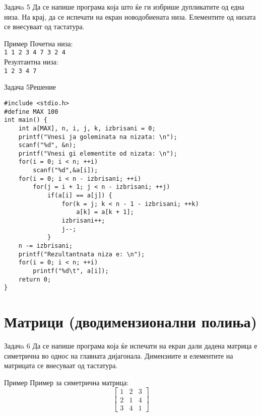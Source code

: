 \begin{frame}{Задачa 5}
Да се напише програма која што ќе ги избрише дупликатите од една низа. На крај,
да се испечати на екран новодобиената низа. Елементите од низата се внесуваат од тастатура.
\begin{exampleblock}{Пример}
Почетна низа:\\
\texttt{1 {\color{red}1} 2 3 4 7 {\color{red}3} {\color{red}2} {\color{red}4}}\\
Резултантна низа:\\
\texttt{1 2 3 4 7}\\
\end{exampleblock}
\end{frame}

\begin{frame}[fragile]{Задача 5}{Решение} 
\begin{lstlisting}
#include <stdio.h>
#define MAX 100
int main() {
    int a[MAX], n, i, j, k, izbrisani = 0;
    printf("Vnesi ja goleminata na nizata: \n");
    scanf("%d", &n);
    printf("Vnesi gi elementite od nizata: \n");
    for(i = 0; i < n; ++i)
        scanf("%d",&a[i]);
    for(i = 0; i < n - izbrisani; ++i)
        for(j = i + 1; j < n - izbrisani; ++j)
            if(a[i] == a[j]) {
                for(k = j; k < n - 1 - izbrisani; ++k)
                    a[k] = a[k + 1];
                izbrisani++;
                j--;
            }
    n -= izbrisani;
    printf("Rezultantnata niza e: \n");
    for(i = 0; i < n; ++i)
        printf("%d\t", a[i]);
    return 0;
}
\end{lstlisting}
\end{frame}

\section{Матрици (дводимензионални полиња)}

\begin{frame}{Задачa 6}
Да се напише програма која ќе испечати на екран дали дадена матрица е симетрична во однос на главната дијагонала. 
Димензиите и елементите на матрицата се внесуваат од тастатура.
\begin{exampleblock}{Пример}
Пример за симетрична матрица:\\
$$\begin{bmatrix}
1 & 2 & 3 \\ 2 & 1 & 4 \\ 3 & 4 & 1
\end{bmatrix}$$
\end{exampleblock}
\end{frame}

